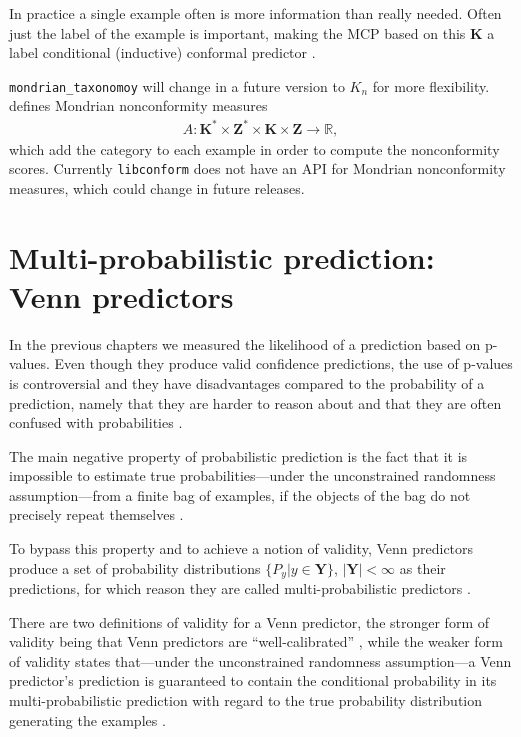 \documentclass[twoside,11pt]{article}
\def\libconform{\texttt{libconform}}
\begin{document}
In practice a single example often is more information than
really needed.
Often just the label of the example is important, making
the MCP based on this $\textbf{K}$ a label conditional
(inductive) conformal predictor
\citep[see][Chapter 2]{cprml}.

\texttt{mondrian\_taxonomoy} will change in a future
version to $K_n$ for more flexibility.
\\

\noindent
\citet[Chapter 4.5]{alrw} defines Mondrian nonconformity
measures
\begin{align*}
  A: \textbf{K}^* \times \textbf{Z}^* \times
  \textbf{K} \times \textbf{Z} \rightarrow \mathbb{R},
\end{align*}
which add the category to each example in order to compute
the nonconformity scores.
Currently \libconform{} does not have an API for Mondrian
nonconformity measures, which could change in
future releases.

\section{Multi-probabilistic prediction: Venn predictors}
\label{sec:venn}

In the previous chapters we measured the likelihood of a
prediction based on p-values. Even though they produce
valid confidence predictions, the use of p-values is
controversial and they have disadvantages compared to
the probability of a prediction, namely that they are
harder to reason about and that they are often confused
with probabilities \citep[see][Chapter 6.3]{alrw}.

The main negative property of probabilistic prediction is
the fact that it is impossible to estimate true
probabilities---under the unconstrained randomness
assumption---from a finite bag of examples, if the objects
of the bag do not precisely repeat themselves
\citep[see][Chapter 5]{alrw}.

To bypass this property and to achieve a notion of
validity, Venn predictors produce a set of probability
distributions $\{P_y|y\in \textbf{Y}\}$,
$|\textbf{Y}| < \infty$ as their predictions, for which
reason they are called multi-probabilistic predictors
\citep[see][Chapter 2.8]{cprml}.

There are two definitions of validity for a Venn predictor,
the stronger form of validity being that Venn predictors
are ``well-calibrated'' \citep[see][Chapter 6]{alrw}, while
the weaker form of validity states that---under the
unconstrained randomness assumption---a Venn predictor's
prediction is guaranteed to contain the conditional
probability in its multi-probabilistic prediction with
regard to the true probability distribution generating the
examples \citep[see][Chapter 2.8]{cprml}.
\end{document}

